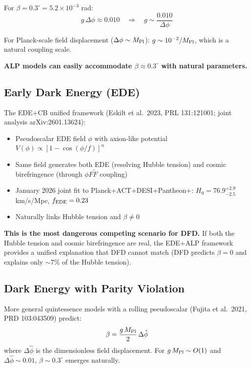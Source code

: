 \documentclass[11pt]{article}
\begin{document}
For $\beta = 0.3^\circ = 5.2 \times 10^{-3}$ rad:
\begin{equation}
g\,\Delta\phi \approx 0.010 \quad \Rightarrow \quad
g \sim \frac{0.010}{\Delta\phi}
\end{equation}

For Planck-scale field displacement ($\Delta\phi \sim M_{\rm Pl}$):
$g \sim 10^{-2}/M_{\rm Pl}$, which is a natural coupling scale.

\textbf{ALP models can easily accommodate $\beta \approx 0.3^\circ$
with natural parameters.}

\subsection{Early Dark Energy (EDE)}

The EDE+CB unified framework (Eskilt et al.\ 2023, PRL 131:121001;
joint analysis arXiv:2601.13624):

\begin{itemize}
\item Pseudoscalar EDE field $\phi$ with axion-like potential
  $V(\phi) \propto [1 - \cos(\phi/f)]^n$
\item Same field generates both EDE (resolving Hubble tension) and
  cosmic birefringence (through $\phi F\tilde{F}$ coupling)
\item January 2026 joint fit to Planck+ACT+DESI+Pantheon+:
  $H_0 = 76.9^{+2.9}_{-2.5}$ km/s/Mpc, $f_{\rm EDE} = 0.23$
\item Naturally links Hubble tension and $\beta \neq 0$
\end{itemize}

\textbf{This is the most dangerous competing scenario for DFD.}
If both the Hubble tension and cosmic birefringence are real, the
EDE+ALP framework provides a unified explanation that DFD cannot match
(DFD predicts $\beta = 0$ and explains only $\sim 7\%$ of the
Hubble tension).

\subsection{Dark Energy with Parity Violation}

More general quintessence models with a rolling pseudoscalar
(Fujita et al.\ 2021, PRD 103:043509) predict:
\begin{equation}
\beta = \frac{g\,M_{\rm Pl}}{2}\,\Delta\hat{\phi}
\end{equation}
where $\Delta\hat{\phi}$ is the dimensionless field displacement.
For $g\,M_{\rm Pl} \sim O(1)$ and $\Delta\hat{\phi} \sim 0.01$,
$\beta \sim 0.3^\circ$ emerges naturally.
\end{document}
